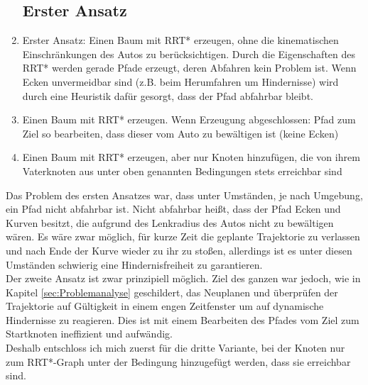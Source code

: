 \begin{enumerate}


\subsection{Erster Ansatz}

\item Erster Ansatz: Einen Baum mit RRT* erzeugen, ohne die kinematischen Einschränkungen des Autos zu berücksichtigen. Durch die Eigenschaften des RRT* werden gerade Pfade erzeugt, deren Abfahren kein Problem ist. Wenn Ecken unvermeidbar sind (z.B. beim Herumfahren um Hindernisse) wird durch eine Heuristik dafür gesorgt, dass der Pfad abfahrbar bleibt.
\item Einen Baum mit RRT* erzeugen. Wenn Erzeugung abgeschlossen: Pfad zum Ziel so bearbeiten, dass dieser vom Auto zu bewältigen ist (keine Ecken)
\item Einen Baum mit RRT* erzeugen, aber nur Knoten hinzufügen, die von ihrem Vaterknoten aus unter oben genannten Bedingungen stets erreichbar sind

\end{enumerate}
Das Problem des ersten Ansatzes war, dass unter Umständen, je nach Umgebung, ein Pfad nicht abfahrbar ist. Nicht abfahrbar heißt, dass der Pfad Ecken und Kurven besitzt, die aufgrund des Lenkradius des Autos nicht zu bewältigen wären. Es wäre zwar möglich, für kurze Zeit die geplante Trajektorie zu verlassen und nach Ende der Kurve wieder zu ihr zu stoßen, allerdings ist es unter diesen Umständen schwierig eine Hindernisfreiheit zu garantieren. \\
Der zweite Ansatz ist zwar prinzipiell möglich. Ziel des ganzen war jedoch, wie in Kapitel \ref{sec:Problemanalyse} geschildert, das Neuplanen und überprüfen der Trajektorie auf Gültigkeit in einem engen Zeitfenster um auf dynamische Hindernisse zu reagieren. Dies ist mit einem Bearbeiten des Pfades vom Ziel zum Startknoten ineffizient und aufwändig.\\
Deshalb entschloss ich mich zuerst für die dritte Variante, bei der Knoten nur zum RRT*-Graph unter der Bedingung hinzugefügt werden, dass sie erreichbar sind.
